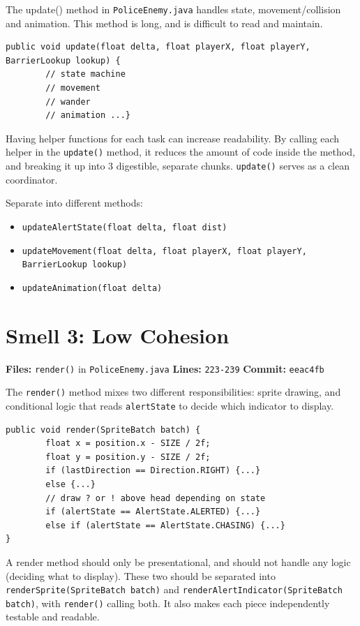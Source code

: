 \documentclass[10pt]{article}
\begin{document}
The update() method in \texttt{PoliceEnemy.java} handles state, movement/collision and animation. This method is long, and is difficult to read and maintain. 

\begin{lstlisting}
public void update(float delta, float playerX, float playerY, BarrierLookup lookup) {
        // state machine
        // movement 
        // wander
        // animation ...}
\end{lstlisting}

Having  helper functions for each task can increase readability. By calling each helper in the \texttt{update()} method, it reduces the amount of code inside the method, and breaking it up into 3 digestible, separate chunks. \texttt{update()} serves as a clean coordinator.

Separate into different methods:
\begin{itemize}
    \item \texttt{updateAlertState(float delta, float dist)}
    \item \texttt{updateMovement(float delta, float playerX, float playerY, BarrierLookup lookup)}
    \item \texttt{updateAnimation(float delta)}
\end{itemize} 


\section*{Smell 3: Low Cohesion}

\textbf{Files:} \texttt{render()} in \texttt{PoliceEnemy.java} \quad
\textbf{Lines:} \texttt{223-239} \quad
\textbf{Commit:} \texttt{eeac4fb}

The \texttt{render()} method mixes two different responsibilities: sprite drawing, 
and conditional logic that reads \texttt{alertState} to decide which indicator 
to display.

\begin{lstlisting}
public void render(SpriteBatch batch) {
        float x = position.x - SIZE / 2f;
        float y = position.y - SIZE / 2f;
        if (lastDirection == Direction.RIGHT) {...} 
        else {...}
        // draw ? or ! above head depending on state
        if (alertState == AlertState.ALERTED) {...} 
        else if (alertState == AlertState.CHASING) {...}
}
\end{lstlisting}

A render method should only be presentational, and should not handle any logic (deciding what to display). These two should be separated into \texttt{renderSprite(SpriteBatch batch)} 
and \texttt{renderAlertIndicator(SpriteBatch batch)}, with \texttt{render()} 
calling both. It also makes each piece independently testable and readable.
\end{document}
